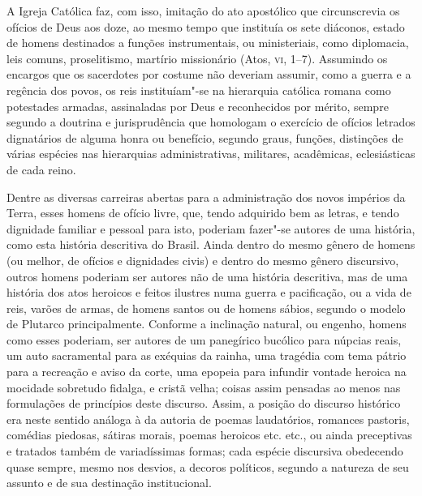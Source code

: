 A Igreja Católica faz, com isso, imitação do ato apostólico que
circunscrevia os ofícios de Deus aos doze, ao mesmo tempo que instituía
os sete diáconos, estado de homens destinados a funções instrumentais,
ou ministeriais, como diplomacia, leis comuns, proselitismo, martírio
missionário (Atos, \textsc{vi}, 1--7). Assumindo os encargos que os sacerdotes
por costume não deveriam assumir, como a guerra e a regência dos povos,
os reis instituíam"-se na hierarquia católica romana como potestades
armadas, assinaladas por Deus e reconhecidos por mérito, sempre segundo
a doutrina e jurisprudência que homologam o exercício de ofícios
letrados dignatários de alguma honra ou benefício, segundo graus,
funções, distinções de várias espécies nas hierarquias administrativas,
militares, acadêmicas, eclesiásticas de cada reino. 

Dentre as diversas carreiras abertas para a administra\-ção dos novos
impérios da Terra, esses homens de ofício livre, que, tendo adquirido
bem as letras, e tendo dignidade familiar e pessoal para isto, poderiam
fazer"-se autores de uma história,
como esta história descritiva do Brasil. Ainda dentro do mesmo gênero
de homens (ou melhor, de ofícios e dignidades civis) e dentro do mesmo
gênero discursivo, outros homens poderiam ser autores não de uma
história descritiva, mas de uma história dos atos heroicos e feitos
ilustres numa guerra e pacificação, ou a vida de reis, varões de armas,
de homens santos ou de homens sábios, segundo o modelo de Plutarco
principalmente. Conforme a inclinação natural, ou engenho, homens como
esses poderiam, ser autores de um panegírico bucólico para núpcias
reais, um auto sacramental para as exéquias da rainha, uma tragédia com
tema pátrio para a recreação e aviso da corte, uma epopeia para
infundir vontade heroica na mocidade sobretudo fidalga, e cristã velha;
coisas assim pensadas ao menos nas formulações de princípios deste
discurso. Assim, a posição do discurso histórico era neste sentido
análoga à da autoria de poemas laudatórios, romances pastoris, comédias
piedosas, sátiras morais, poemas heroicos etc. etc., ou ainda
preceptivas e tratados também de variadíssimas formas; cada espécie
discursiva obedecendo quase sempre, mesmo nos desvios, a decoros
políticos, segundo a natureza de seu assunto e de sua destinação institucional.

